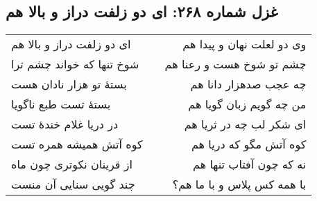 \begin{center}
\section*{غزل شماره ۲۶۸: ای دو زلفت دراز و بالا هم}
\label{sec:268}
\begin{longtable}{l p{0.5cm} r}
ای دو زلفت دراز و بالا هم
&&
وی دو لعلت نهان و پیدا هم
\\
شوخ تنها که خواند چشم ترا
&&
چشم تو شوخ هست و رعنا هم
\\
بستهٔ تو هزار نادان هست
&&
چه عجب صدهزار دانا هم
\\
بستهٔ تست طبع ناگویا
&&
من چه گویم زبان گویا هم
\\
در دریا غلام خندهٔ تست
&&
ای شکر لب چه در ثریا هم
\\
کوه آتش همیشه همره تست
&&
کوه آتش مگو که دریا هم
\\
از قرینان نکوتری چون ماه
&&
نه که چون آفتاب تنها هم
\\
چند گویی سنایی آن منست
&&
با همه کس پلاس و با ما هم؟
\\
\end{longtable}
\end{center}
